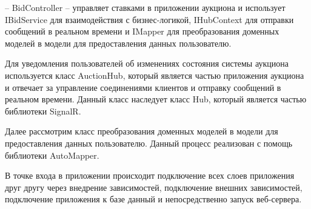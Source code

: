 – BidController – управляет ставками в приложении аукциона и использует IBidService для взаимодействия с бизнес-логикой, 
IHubContext для отправки сообщений в реальном времени и 
IMapper для преобразования доменных моделей в модели для предоставления данных пользователю.

Для уведомления пользователей об изменениях состояния системы аукциона используется класс AuctionHub, 
который является частью приложения аукциона и отвечает за управление соединениями клиентов и отправку сообщений в реальном времени.
Данный класс наследует класс Hub, который является частью библиотеки SignalR.

Далее рассмотрим класс преобразования доменных моделей в модели для предоставления данных пользователю. 
Данный процесс реализован с помощь библиотеки AutoMapper. 

В точке входа в приложении происходит подключение всех слоев приложения друг другу через внедрение зависимостей, 
подключение внешних зависимостей, подключение приложения к базе данный и непосредственно запуск веб-сервера. 
